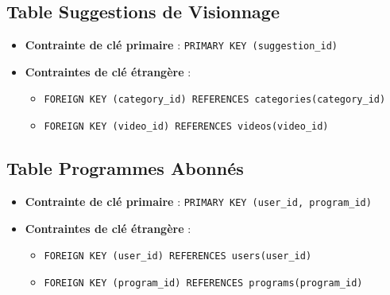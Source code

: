 \documentclass{article}
\begin{document}
\subsection{Table Suggestions de Visionnage}

\begin{itemize}
    \item \textbf{Contrainte de clé primaire} : \texttt{PRIMARY KEY (suggestion\_id)}
    \item \textbf{Contraintes de clé étrangère} :
    \begin{itemize}
        \item \texttt{FOREIGN KEY (category\_id) REFERENCES categories(category\_id)}
        \item \texttt{FOREIGN KEY (video\_id) REFERENCES videos(video\_id)}
    \end{itemize}
\end{itemize}

\subsection{Table Programmes Abonnés}

\begin{itemize}
    \item \textbf{Contrainte de clé primaire} : \texttt{PRIMARY KEY (user\_id, program\_id)}
    \item \textbf{Contraintes de clé étrangère} :
    \begin{itemize}
        \item \texttt{FOREIGN KEY (user\_id) REFERENCES users(user\_id)}
        \item \texttt{FOREIGN KEY (program\_id) REFERENCES programs(program\_id)}
    \end{itemize}
\end{itemize}
\end{document}
